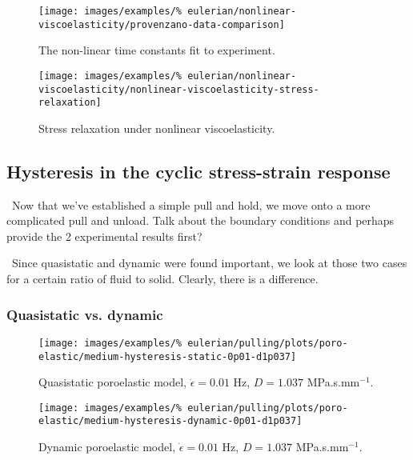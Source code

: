 \begin{figure}[!hptb]
\centering
\texttt{[image: images/examples/\%
eulerian/nonlinear-viscoelasticity/provenzano-data-comparison]}
\caption{The non-linear time constants fit to experiment.} 
\label{provenzano-data-fit}
\end{figure}

\begin{figure}[!hptb]
\centering
\texttt{[image: images/examples/\%
eulerian/nonlinear-viscoelasticity/nonlinear-viscoelasticity-stress-relaxation]}
\caption{Stress relaxation under nonlinear viscoelasticity.}
\label{nonlinear-viscoelasticity-stress-relaxation}
\end{figure}

\clearpage

\subsection{Hysteresis in the cyclic stress-strain response}
\label{hysteresis}

\textbullet\ Now that we've established a simple pull and hold, we
move onto a more complicated pull and unload. Talk about the boundary
conditions and perhaps provide the 2 experimental results first?

\textbullet\ Since quasistatic and dynamic were found important, we
look at those two cases for a certain ratio of fluid to
solid. Clearly, there is a difference.

\subsubsection{Quasistatic vs. dynamic}
\label{quasistatic-vs-dynamic}

\begin{figure}[!hptb]
\centering
\texttt{[image: images/examples/\%
eulerian/pulling/plots/poro-elastic/medium-hysteresis-static-0p01-d1p037]}
\caption{Quasistatic poroelastic model, $\dot{\epsilon}=0.01$ Hz, $D=1.037$
  MPa.s.mm$^{-1}$.}
\label{medium-hysteresis-static-0p01-d1p037}
\end{figure}

\begin{figure}[!hptb]
\centering
\texttt{[image: images/examples/\%
eulerian/pulling/plots/poro-elastic/medium-hysteresis-dynamic-0p01-d1p037]}
\caption{Dynamic poroelastic model, $\dot{\epsilon}=0.01$ Hz, $D=1.037$
  MPa.s.mm$^{-1}$.}
\label{medium-hysteresis-dynamic-0p01-d1p037}
\end{figure}

